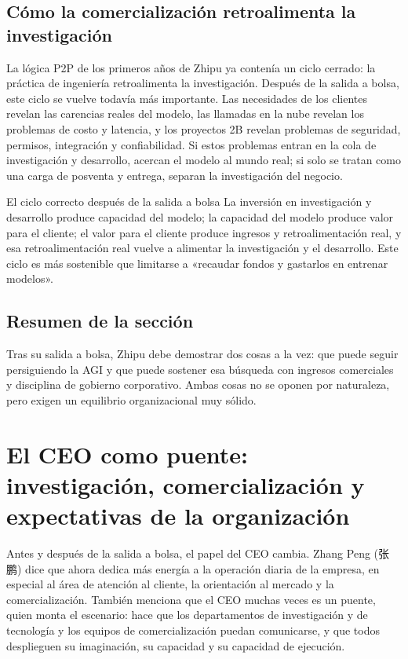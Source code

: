 \documentclass[a4paper]{article}
\begin{document}
\subsection{Cómo la comercialización retroalimenta la investigación}

La lógica P2P de los primeros años de Zhipu ya contenía un ciclo cerrado: la práctica de ingeniería retroalimenta la investigación. Después de la salida a bolsa, este ciclo se vuelve todavía más importante. Las necesidades de los clientes revelan las carencias reales del modelo, las llamadas en la nube revelan los problemas de costo y latencia, y los proyectos 2B revelan problemas de seguridad, permisos, integración y confiabilidad. Si estos problemas entran en la cola de investigación y desarrollo, acercan el modelo al mundo real; si solo se tratan como una carga de posventa y entrega, separan la investigación del negocio.

\begin{importantbox}{El ciclo correcto después de la salida a bolsa}
La inversión en investigación y desarrollo produce capacidad del modelo; la capacidad del modelo produce valor para el cliente; el valor para el cliente produce ingresos y retroalimentación real, y esa retroalimentación real vuelve a alimentar la investigación y el desarrollo. Este ciclo es más sostenible que limitarse a «recaudar fondos y gastarlos en entrenar modelos».
\end{importantbox}

\subsection{Resumen de la sección}

Tras su salida a bolsa, Zhipu debe demostrar dos cosas a la vez: que puede seguir persiguiendo la AGI y que puede sostener esa búsqueda con ingresos comerciales y disciplina de gobierno corporativo. Ambas cosas no se oponen por naturaleza, pero exigen un equilibrio organizacional muy sólido.
\section{El CEO como puente: investigación, comercialización y expectativas de la organización}

Antes y después de la salida a bolsa, el papel del CEO cambia. Zhang Peng (张鹏) dice que ahora dedica más energía a la operación diaria de la empresa, en especial al área de atención al cliente, la orientación al mercado y la comercialización. También menciona que el CEO muchas veces es un puente, quien monta el escenario: hace que los departamentos de investigación y de tecnología y los equipos de comercialización puedan comunicarse, y que todos desplieguen su imaginación, su capacidad y su capacidad de ejecución.
\end{document}

